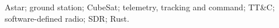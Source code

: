 Astar; ground station; CubeSat; telemetry, tracking and command; TT\&C; software-defined radio; SDR; Rust.
